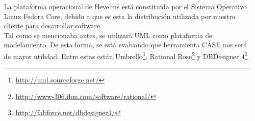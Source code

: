 \documentclass[letterpaper,spanish,10pt]{article}
\begin{document}
La plataforma operacional de Hevelius est\'a constituida por el Sistema Operativo Linux Fedora Core, debido a que es esta la distribuci\'on utilizada por nuestro cliente para desarrollar software.\\



Tal como se mencionaba antes, se utilizar\'a UML como plataforma de modelamiento. De esta forma, se est\'a evaluando que herramienta CASE nos ser\'a de mayor utilidad. Entre estas est\'an Umbrello\footnote{\url{http://uml.sourceforge.net/}}, Rational Rose\footnote{\url{http://www-306.ibm.com/software/rational/}} y DBDesigner 4\footnote{\url{http://fabforce.net/dbdesigner4/}}

\end{document}
